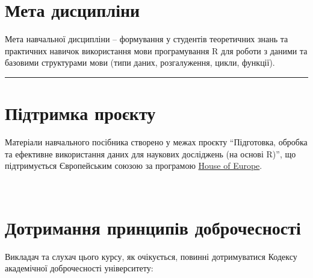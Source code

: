 \documentclass[
  letterpaper,
  DIV=11,
  numbers=noendperiod]{scrreprt}
\begin{document}
\section*{Мета
дисципліни}\label{ux43cux435ux442ux430-ux434ux438ux441ux446ux438ux43fux43bux456ux43dux438}


Мета навчальної дисципліни -- формування у студентів теоретичних знань
та практичних навичок використання мови програмування R для роботи з
даними та базовими структурами мови (типи даних, розгалуження, цикли,
функції).

\begin{center}\rule{0.5\linewidth}{0.5pt}\end{center}

\section*{Підтримка
проєкту}\label{ux43fux456ux434ux442ux440ux438ux43cux43aux430-ux43fux440ux43eux454ux43aux442ux443}


Матеріали навчального посібника створено у межах проєкту ``Підготовка,
обробка та ефективне використання даних для наукових досліджень (на
основі R)'', що підтримується Європейським союзою за програмою
\href{https://houseofeurope.org.ua/}{House of Europe}.

~~

\section*{Дотримання принципів
доброчесності}\label{ux434ux43eux442ux440ux438ux43cux430ux43dux43dux44f-ux43fux440ux438ux43dux446ux438ux43fux456ux432-ux434ux43eux431ux440ux43eux447ux435ux441ux43dux43eux441ux442ux456}


Викладач та слухач цього курсу, як очікується, повинні дотримуватися
Кодексу академічної доброчесності університету:
\end{document}
